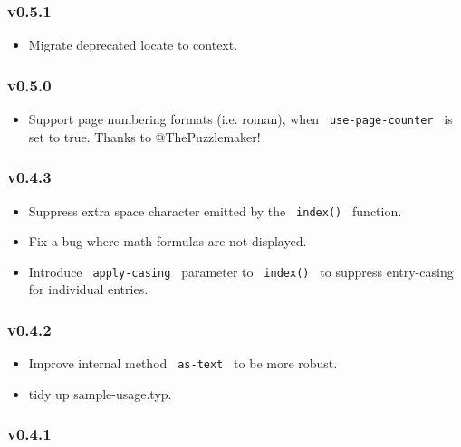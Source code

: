 \subsubsection{v0.5.1}\label{v0.5.1}

\begin{itemize}
\tightlist
\item
  Migrate deprecated locate to context.
\end{itemize}

\subsubsection{v0.5.0}\label{v0.5.0}

\begin{itemize}
\tightlist
\item
  Support page numbering formats (i.e. roman), when
  \texttt{\ use-page-counter\ } is set to true. Thanks to
  @ThePuzzlemaker!
\end{itemize}

\subsubsection{v0.4.3}\label{v0.4.3}

\begin{itemize}
\tightlist
\item
  Suppress extra space character emitted by the \texttt{\ index()\ }
  function.
\item
  Fix a bug where math formulas are not displayed.
\item
  Introduce \texttt{\ apply-casing\ } parameter to \texttt{\ index()\ }
  to suppress entry-casing for individual entries.
\end{itemize}

\subsubsection{v0.4.2}\label{v0.4.2}

\begin{itemize}
\tightlist
\item
  Improve internal method \texttt{\ as-text\ } to be more robust.
\item
  tidy up sample-usage.typ.
\end{itemize}

\subsubsection{v0.4.1}\label{v0.4.1}

